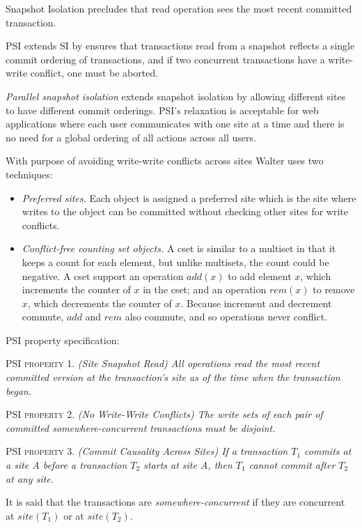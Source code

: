 \documentclass[a4paper]{article}
\begin{document}
Snapshot Isolation precludes that read operation sees the most recent committed transaction.

PSI extends SI by ensures that transactions read from a snapshot reflects a single commit ordering of transactions, and if two concurrent transactions have a write-write conflict, one must be aborted.
 
\textit{Parallel snapshot isolation} extends snapshot isolation by allowing different sites to have different commit orderings. PSI's relaxation is acceptable for web applications where each user communicates with one site at a time and there is no need for a global ordering of all actions across all users. 

With purpose of avoiding write-write conflicts across sites Walter uses two techniques:
\begin{itemize}
\item \textit{Preferred sites.} Each object is assigned a preferred site which is the site where writes to the object can be committed without checking other sites for write conflicts.
\item \textit{Conflict-free counting set objects.} A cset is similar to a multiset in that it keeps a count for each element, but unlike multisets, the count could be negative. A cset support an operation $add(x)$ to add element $x$, which increments the counter of $x$ in the cset; and an operation $rem(x)$ to remove $x$, which decrements the counter of $x$. Because increment and decrement commute, $add$ and $rem$ also commute, and so operations never conflict. 
\end{itemize}

PSI property specification:

PSI \textsc{property} 1. \textit{(Site Snapshot Read) All operations read the most recent committed version at the transaction's site as of the time when the transaction began.}

PSI \textsc{property} 2. \textit{(No Write-Write Conflicts) The write sets of each pair of committed somewhere-concurrent transactions must be disjoint.}

PSI \textsc{property} 3. \textit{(Commit Causality Across Sites) If a transaction $T_{1}$ commits at a site A before a transaction $T_{2}$ starts at site A, then $T_{1}$ cannot commit after $T_{2}$ at any site.}

It is said that the transactions are \textit{somewhere-concurrent} if they are concurrent at $site(T_{1})$ or at $site(T_{2})$.
\end{document}
